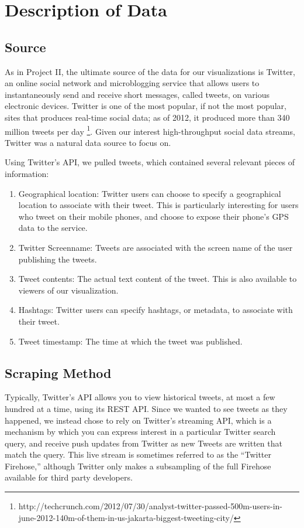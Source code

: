 \documentclass[pdftex,12pt,a4paper]{article}
\begin{document}
\section{Description of Data}
\subsection{Source}
As in Project II, the ultimate source of the data for our visualizations is Twitter, an online social network and microblogging service that allows users to instantaneously send and receive short messages, called tweets, on various electronic devices. Twitter is one of the most popular, if not the most popular, sites that produces real-time social data; as of 2012, it produced more than 340 million tweets per day \footnote{http://techcrunch.com/2012/07/30/analyst-twitter-passed-500m-users-in-june-2012-140m-of-them-in-us-jakarta-biggest-tweeting-city/}. Given our interest high-throughput social data streams, Twitter was a natural data source to focus on.

Using Twitter's API, we pulled tweets, which contained several relevant pieces of information:
\begin{enumerate}
\item Geographical location: Twitter users can choose to specify a geographical location to associate with their tweet. This is particularly interesting for users who tweet on their mobile phones, and choose to expose their phone's GPS data to the service.
\item Twitter Screenname: Tweets are associated with the screen name of the user publishing the tweets.
\item Tweet contents: The actual text content of the tweet. This is also available to viewers of our visualization.
\item Hashtags: Twitter users can specify hashtags, or metadata, to associate with their tweet. 
\item Tweet timestamp: The time at which the tweet was published.
\end{enumerate}

\subsection{Scraping Method}

Typically, Twitter's API allows you to view historical tweets, at most a few
hundred at a time, using its REST API. Since we wanted to see tweets as they
happened, we instead chose to rely on Twitter's streaming API, which is a
mechanism by which you can express interest in a particular Twitter search
query, and receive push updates from Twitter as new Tweets are written that
match the query. This live stream is sometimes referred to as the ``Twitter
Firehose,'' although Twitter only makes a subsampling of the full Firehose
available for third party developers.
\end{document}
